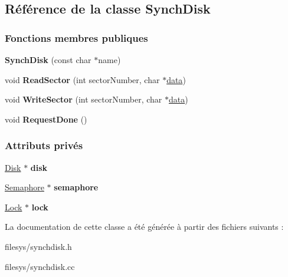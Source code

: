 \hypertarget{class_synch_disk}{}\subsection{Référence de la classe Synch\+Disk}
\label{class_synch_disk}
\subsubsection*{Fonctions membres publiques}
\begin{DoxyCompactItemize}
\item 
\hypertarget{class_synch_disk_aa6cc1815e0aca2d6fe11d426942e6538}{}\label{class_synch_disk_aa6cc1815e0aca2d6fe11d426942e6538} 
{\bfseries Synch\+Disk} (const char $\ast$name)
\item 
\hypertarget{class_synch_disk_a7d8195bd5d464e4771946eb03c61e8c8}{}\label{class_synch_disk_a7d8195bd5d464e4771946eb03c61e8c8} 
void {\bfseries Read\+Sector} (int sector\+Number, char $\ast$\hyperlink{structdata}{data})
\item 
\hypertarget{class_synch_disk_aadb7e2ce6cf32727e493c63c5ea1018b}{}\label{class_synch_disk_aadb7e2ce6cf32727e493c63c5ea1018b} 
void {\bfseries Write\+Sector} (int sector\+Number, char $\ast$\hyperlink{structdata}{data})
\item 
\hypertarget{class_synch_disk_a973a65b7b7b92f5fabf18da8b8bae402}{}\label{class_synch_disk_a973a65b7b7b92f5fabf18da8b8bae402} 
void {\bfseries Request\+Done} ()
\end{DoxyCompactItemize}
\subsubsection*{Attributs privés}
\begin{DoxyCompactItemize}
\item 
\hypertarget{class_synch_disk_a8999601462179076bfd16a20d56efc0b}{}\label{class_synch_disk_a8999601462179076bfd16a20d56efc0b} 
\hyperlink{class_disk}{Disk} $\ast$ {\bfseries disk}
\item 
\hypertarget{class_synch_disk_a5fc105281b2871f863df2e955b8f3ed2}{}\label{class_synch_disk_a5fc105281b2871f863df2e955b8f3ed2} 
\hyperlink{class_semaphore}{Semaphore} $\ast$ {\bfseries semaphore}
\item 
\hypertarget{class_synch_disk_a7a49e93079ba87bb0da8c724883e50ff}{}\label{class_synch_disk_a7a49e93079ba87bb0da8c724883e50ff} 
\hyperlink{class_lock}{Lock} $\ast$ {\bfseries lock}
\end{DoxyCompactItemize}


La documentation de cette classe a été générée à partir des fichiers suivants \+:\begin{DoxyCompactItemize}
\item 
filesys/synchdisk.\+h\item 
filesys/synchdisk.\+cc\end{DoxyCompactItemize}
